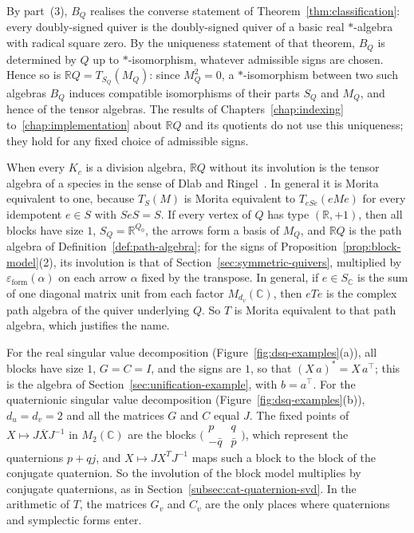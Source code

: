 \documentclass[12pt, a4paper]{report}
\theoremstyle{plain}
\theoremstyle{definition}
\theoremstyle{remark}
\theoremstyle{plain}
\newcommand{\epsilonform}{\varepsilon_{\mathrm{form}}}
\newcommand{\RR}{\mathbb{R}}
\newcommand{\CC}{\mathbb{C}}
\begin{document}
By part~(3), $B_Q$ realises the converse statement of Theorem~\ref{thm:classification}: every doubly-signed quiver is the doubly-signed quiver of a basic real $*$-algebra with radical square zero. By the uniqueness statement of that theorem, $B_Q$ is determined by $Q$ up to $*$-isomorphism, whatever admissible signs are chosen. Hence so is $\RR Q=T_{S_Q}(M_Q)$: since $M_Q^2=0$, a $*$-isomorphism between two such algebras $B_Q$ induces compatible isomorphisms of their parts $S_Q$ and $M_Q$, and hence of the tensor algebras. The results of Chapters~\ref{chap:indexing} to~\ref{chap:implementation} about $\RR Q$ and its quotients do not use this uniqueness; they hold for any fixed choice of admissible signs.

When every $K_c$ is a division algebra, $\RR Q$ without its involution is the tensor algebra of a species in the sense of Dlab and Ringel~\cite{DlabRingel1976}. In general it is Morita equivalent to one, because $T_{S}(M)$ is Morita equivalent to $T_{eSe}(eMe)$ for every idempotent $e\in S$ with $SeS=S$. If every vertex of $Q$ has type $(\RR,+1)$, then all blocks have size $1$, $S_Q=\RR^{Q_0}$, the arrows form a basis of $M_Q$, and $\RR Q$ is the path algebra of Definition~\ref{def:path-algebra}; for the signs of Proposition~\ref{prop:block-model}(2), its involution is that of Section~\ref{sec:symmetric-quivers}, multiplied by $\epsilonform(\alpha)$ on each arrow $\alpha$ fixed by the transpose. In general, if $e\in S_\CC$ is the sum of one diagonal matrix unit from each factor $M_{d_v}(\CC)$, then $eTe$ is the complex path algebra of the quiver underlying $Q$. So $T$ is Morita equivalent to that path algebra, which justifies the name.

For the real singular value decomposition (Figure~\ref{fig:dsq-examples}(a)), all blocks have size $1$, $G=C=I$, and the signs are $1$, so that $(X\,a)^*=X\,a^{\top}$; this is the algebra of Section~\ref{sec:unification-example}, with $b=a^{\top}$. For the quaternionic singular value decomposition (Figure~\ref{fig:dsq-examples}(b)), $d_u=d_v=2$ and all the matrices $G$ and $C$ equal $J$. The fixed points of $X\mapsto J\overline XJ^{-1}$ in $M_2(\CC)$ are the blocks $\bigl(\begin{smallmatrix}p&q\\-\bar q&\bar p\end{smallmatrix}\bigr)$, which represent the quaternions $p+qj$, and $X\mapsto JX^TJ^{-1}$ maps such a block to the block of the conjugate quaternion. So the involution of the block model multiplies by conjugate quaternions, as in Section~\ref{subsec:cat-quaternion-svd}. In the arithmetic of $T$, the matrices $G_v$ and $C_v$ are the only places where quaternions and symplectic forms enter.
\end{document}
